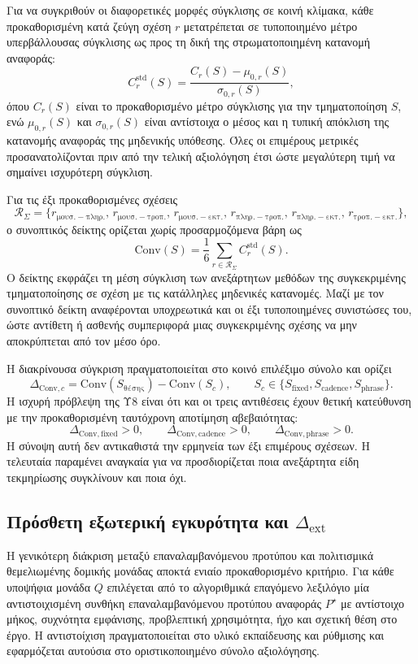 \documentclass[11pt,a4paper]{article}
\begin{document}
Για να συγκριθούν οι διαφορετικές μορφές σύγκλισης σε κοινή κλίμακα, κάθε προκαθορισμένη κατά ζεύγη σχέση \(r\) μετατρέπεται σε τυποποιημένο μέτρο υπερβάλλουσας σύγκλισης ως προς τη δική της στρωματοποιημένη κατανομή αναφοράς:
\[
C_r^{\mathrm{std}}(S)
=
\frac{C_r(S)-\mu_{0,r}(S)}{\sigma_{0,r}(S)},
\]
όπου \(C_r(S)\) είναι το προκαθορισμένο μέτρο σύγκλισης για την τμηματοποίηση \(S\), ενώ \(\mu_{0,r}(S)\) και \(\sigma_{0,r}(S)\) είναι αντίστοιχα ο μέσος και η τυπική απόκλιση της κατανομής αναφοράς της μηδενικής υπόθεσης. Όλες οι επιμέρους μετρικές προσανατολίζονται πριν από την τελική αξιολόγηση έτσι ώστε μεγαλύτερη τιμή να σημαίνει ισχυρότερη σύγκλιση.

Για τις έξι προκαθορισμένες σχέσεις
\[
\mathcal R_{\Sigma}=
\{r_{\mathrm{μουσ.-πληρ.}},\,r_{\mathrm{μουσ.-τροπ.}},\,r_{\mathrm{μουσ.-εκτ.}},\,
r_{\mathrm{πληρ.-τροπ.}},\,r_{\mathrm{πληρ.-εκτ.}},\,r_{\mathrm{τροπ.-εκτ.}}\},
\]
ο συνοπτικός δείκτης ορίζεται χωρίς προσαρμοζόμενα βάρη ως
\[
\mathrm{Conv}(S)
=
\frac{1}{6}
\sum_{r\in\mathcal R_{\Sigma}}C_r^{\mathrm{std}}(S).
\]
Ο δείκτης εκφράζει τη μέση σύγκλιση των ανεξάρτητων μεθόδων της συγκεκριμένης τμηματοποίησης σε σχέση με τις κατάλληλες μηδενικές κατανομές. Μαζί με τον συνοπτικό δείκτη αναφέρονται υποχρεωτικά και οι έξι τυποποιημένες συνιστώσες του, ώστε αντίθετη ή ασθενής συμπεριφορά μιας συγκεκριμένης σχέσης να μην αποκρύπτεται από τον μέσο όρο.

Η διακρίνουσα σύγκριση πραγματοποιείται στο κοινό επιλέξιμο σύνολο και ορίζει
\[
\Delta_{\mathrm{Conv},c}
=
\mathrm{Conv}(S_{\mathrm{θέσης}})-\mathrm{Conv}(S_c),
\qquad
S_c\in\{S_{\mathrm{fixed}},S_{\mathrm{cadence}},S_{\mathrm{phrase}}\}.
\]
Η ισχυρή πρόβλεψη της Υ8 είναι ότι και οι τρεις αντιθέσεις έχουν θετική κατεύθυνση με την προκαθορισμένη ταυτόχρονη αποτίμηση αβεβαιότητας:
\[
\Delta_{\mathrm{Conv,fixed}}>0,\qquad
\Delta_{\mathrm{Conv,cadence}}>0,\qquad
\Delta_{\mathrm{Conv,phrase}}>0.
\]
Η σύνοψη αυτή δεν αντικαθιστά την ερμηνεία των έξι επιμέρους σχέσεων. Η τελευταία παραμένει αναγκαία για να προσδιορίζεται ποια ανεξάρτητα είδη τεκμηρίωσης συγκλίνουν και ποια όχι.

\subsection{\texorpdfstring{Πρόσθετη εξωτερική εγκυρότητα και \(\Delta_{\mathrm{ext}}\)}{Πρόσθετη εξωτερική εγκυρότητα και Delta ext}}\label{app:stats-ext}

Η γενικότερη διάκριση μεταξύ επαναλαμβανόμενου προτύπου και πολιτισμικά θεμελιωμένης δομικής μονάδας αποκτά ενιαίο προκαθορισμένο κριτήριο. Για κάθε υποψήφια μονάδα $Q$ επιλέγεται από το αλγοριθμικά επαγόμενο λεξιλόγιο μία αντιστοιχισμένη συνθήκη επαναλαμβανόμενου προτύπου αναφοράς $P^{\star}$ με αντίστοιχο μήκος, συχνότητα εμφάνισης, προβλεπτική χρησιμότητα, ήχο και σχετική θέση στο έργο. Η αντιστοίχιση πραγματοποιείται στο υλικό εκπαίδευσης και ρύθμισης και εφαρμόζεται αυτούσια στο οριστικοποιημένο σύνολο αξιολόγησης.
\end{document}
